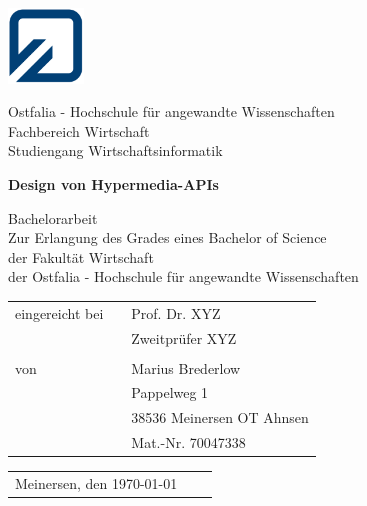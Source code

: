 

\begin{titlepage}

	\thispagestyle{empty}

	\begin{minipage}{2.1cm}
		\includegraphics[width=2cm]{graphicx/fh_logo_klein.jpg}
	\end{minipage}
	\begin{minipage}{10.0cm}
		Ostfalia - Hochschule für angewandte Wissenschaften\\
		Fachbereich Wirtschaft\\
		Studiengang Wirtschaftsinformatik
	\end{minipage}

	\vspace{35mm}

	\begin{center}
		\LARGE \textbf{Design von Hypermedia-APIs\\[25mm]}
	\end{center}

	\begin{center}
		\normalsize Bachelorarbeit\\[1cm]
		Zur Erlangung des Grades eines Bachelor of Science\\ 
		der Fakultät Wirtschaft\\
		der Ostfalia - Hochschule für angewandte Wissenschaften\\[18mm]
	\end{center}

	\begin{table}[h]
		\centering
		\hspace{50mm}\begin{tabular}{lcl}
			eingereicht bei &  & Prof. Dr. XYZ\\
			& & Zweitprüfer XYZ \\
			& & \\
			von & & Marius Brederlow\\
			& & Pappelweg 1\\
			& & 38536 Meinersen OT Ahnsen\\
			& & Mat.-Nr. 70047338\\
		\end{tabular}
	\end{table}

	\vspace{30mm}

	\begin{table}[h]
		\begin{tabular}{lll}
			Meinersen, den \today\\
		\end{tabular}
	\end{table}

\end{titlepage}
